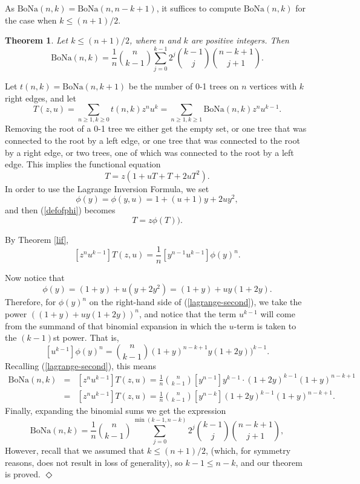 \documentclass[11pt]{article}
\newcommand{\bona}{\mathrm{BoNa}}
\newcommand{\qed}{\mbox{$\Diamond$}\vspace{\baselineskip}}
\newtheorem{theorem}{Theorem}[section]
\newenvironment{proof}{\noindent {\bf Proof:}}{{\qed}}
\begin{document}
 As $\bona(n,k)=\bona(n,n-k+1)$,
it suffices to compute $\bona(n,k)$ for the case when $k\leq (n+1)/2$.

\begin{theorem}  \label{explicit}
Let $k\leq (n+1)/2$, where $n$ and $k$ are positive integers. Then
\[\bona(n,k)=\frac{1}{n} {n\choose k-1} \sum_{j=0}^{k-1} 2^j {k-1\choose j}{n-k+1\choose j+1} .\]
\end{theorem}

\begin{proof} Let $t(n,k)=\bona(n,k+1)$ be the number of 0-1 trees on $n$ vertices with $k$ right edges, and let
\begin{equation} \label{bivariate-tree} T(z,u)=\sum_{n\geq 1,k\geq 0} t(n,k) z^n u^k = \sum_{n\geq 1,k\geq 1} \bona(n,k)z^n u^{k-1}. \end{equation} 
Removing the root of a 0-1 tree we either get the empty set, or one tree that was connected to the root by a left edge, or one tree that was connected to the
root by a right edge, or two trees, one of which was connected to the root by a left edge.  This implies the functional equation
\[T=z(1+uT+T+2uT^2).\]
In order to use the Lagrange Inversion Formula, we set 
\begin{equation} \label{defofphi} \phi(y)=\phi(y,u)=1+(u+1)y+2uy^2,\end{equation} and then (\ref{defofphi}) becomes
\begin{equation} \label{lagrange-first} T=z\phi(T)) .\end{equation} 

By Theorem \ref{lif}, 
\begin{equation} \label{lagrange-second} [z^nu^{k-1}] T(z,u)=\frac{1}{n}[y^{n-1}u^{k-1}] \phi(y)^n.\end{equation}

Now notice that 
\[\phi(y)=(1+y)+u(y+2y^2)=(1+y)+uy(1+2y) .\]
Therefore, for $\phi(y)^n$ on the right-hand side of (\ref{lagrange-second}), we take the power $((1+y)+uy(1+2y))^n$, and notice
that the term $u^{k-1}$ will come from the summand of that binomial expansion in which the $u$-term is taken to the $(k-1)$st power. 
That is, 
\[[u^{k-1}]\phi(y)^n = {n\choose k-1} (1+y)^{n-k+1}y(1+2y))^{k-1} .\] 
Recalling (\ref{lagrange-second}), this means
\begin{eqnarray*} \bona(n,k) & = & [z^nu^{k-1}]T(z,u)=\frac{1}{n} {n\choose k-1}[y^{n-1} ]y^{k-1}\cdot(1+2y)^{k-1} (1+y)^{n-k+1} \\
& = & [z^nu^{k-1}]T(z,u)=\frac{1}{n} {n\choose k-1}[y^{n-k} ](1+2y)^{k-1} (1+y)^{n-k+1}.\end{eqnarray*}
Finally, expanding the binomial sums we get the expression
\[\bona(n,k)=\frac{1}{n} {n\choose k-1} \sum_{j=0}^{\min(k-1,n-k)} 2^j {k-1\choose j}{n-k+1\choose j+1} ,\]
However, recall that we assumed that $k\leq (n+1)/2$, (which, for symmetry reasons, does not result in loss of generality), so 
$k-1\leq n-k$, and our theorem is proved.  
\end{proof}
\end{document}
